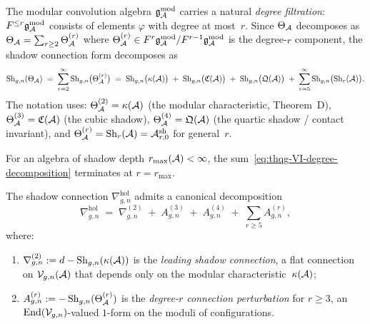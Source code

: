 \begin{remark}
\label{rem:thqg-VI-degree-filtration}
The modular convolution algebra $\mathfrak{g}_{\mathcal{A}}^{\mathrm{mod}}$ carries a natural
\emph{degree filtration}: $F^{\leq r}\mathfrak{g}_{\mathcal{A}}^{\mathrm{mod}}$ consists of elements
$\varphi$ with degree at most~$r$. Since $\Theta_{\mathcal{A}}$ decomposes
as $\Theta_{\mathcal{A}} = \sum_{r \geq 2} \Theta_{\mathcal{A}}^{(r)}$ where
$\Theta_{\mathcal{A}}^{(r)} \in F^r\mathfrak{g}_{\mathcal{A}}^{\mathrm{mod}} / F^{r-1}\mathfrak{g}_{\mathcal{A}}^{\mathrm{mod}}$ is the degree-$r$
component, the shadow connection form decomposes as
\begin{equation}\label{eq:thqg-VI-degree-decomposition}
\operatorname{Sh}_{g,n}(\Theta_{\mathcal{A}})
\;=\;
\sum_{r=2}^{\infty}
\operatorname{Sh}_{g,n}\bigl(\Theta_{\mathcal{A}}^{(r)}\bigr)
\;=\;
\operatorname{Sh}_{g,n}\bigl(\kappa(\mathcal{A})\bigr)
\;+\;
\operatorname{Sh}_{g,n}\bigl(\mathfrak{C}(\mathcal{A})\bigr)
\;+\;
\operatorname{Sh}_{g,n}\bigl(\mathfrak{Q}(\mathcal{A})\bigr)
\;+\;
\sum_{r=5}^{\infty}\operatorname{Sh}_{g,n}\bigl(\operatorname{Sh}_r(\mathcal{A})\bigr).
\end{equation}
The notation uses:
$\Theta_{\mathcal{A}}^{(2)} = \kappa(\mathcal{A})$ (the modular characteristic,
Theorem~D),
$\Theta_{\mathcal{A}}^{(3)} = \mathfrak{C}(\mathcal{A})$ (the cubic shadow),
$\Theta_{\mathcal{A}}^{(4)} = \mathfrak{Q}(\mathcal{A})$ (the quartic shadow /
contact invariant), and
$\Theta_{\mathcal{A}}^{(r)} = \operatorname{Sh}_r(\mathcal{A}) = \mathcal{A}^{\mathrm{sh}}_{r,0}$
for general~$r$.

For an algebra of shadow depth $r_{\max}(\mathcal{A}) < \infty$,
the sum~\eqref{eq:thqg-VI-degree-decomposition} terminates at
$r = r_{\max}$.
\end{remark}

\begin{proposition}
\label{prop:thqg-VI-degree-decomposition}
The shadow connection $\nabla^{\mathrm{hol}}_{g,n}$ admits a canonical
decomposition
\begin{equation}\label{eq:thqg-VI-nabla-degree}
\nabla^{\mathrm{hol}}_{g,n}
\;=\;
\nabla^{(2)}_{g,n}
\;+\;
A^{(3)}_{g,n}
\;+\;
A^{(4)}_{g,n}
\;+\;
\sum_{r \geq 5} A^{(r)}_{g,n},
\end{equation}
where:
\begin{enumerate}[label=\textup{(\roman*)}]
\item $\nabla^{(2)}_{g,n} := d - \operatorname{Sh}_{g,n}(\kappa(\mathcal{A}))$ is
 the \emph{leading shadow connection}, a flat connection on
 $\mathcal{V}_{g,n}(\mathcal{A})$ that depends only on the modular
 characteristic~$\kappa(\mathcal{A})$;
\item $A^{(r)}_{g,n} := -\operatorname{Sh}_{g,n}(\Theta_{\mathcal{A}}^{(r)})$ is
 the \emph{degree-$r$ connection perturbation} for $r \geq 3$,
 an $\operatorname{End}(\mathcal{V}_{g,n})$-valued $1$-form on the moduli of
 configurations.
\end{enumerate}
\end{proposition}

